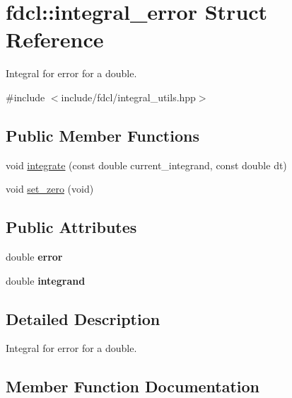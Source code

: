 \hypertarget{structfdcl_1_1integral__error}{}\section{fdcl\+:\+:integral\+\_\+error Struct Reference}
\label{structfdcl_1_1integral__error}


Integral for error for a double.  




{\ttfamily \#include $<$include/fdcl/integral\+\_\+utils.\+hpp$>$}

\subsection*{Public Member Functions}
\begin{DoxyCompactItemize}
\item 
void \hyperlink{structfdcl_1_1integral__error_a93deb8d83156931e7bbb4a0c85cc780a}{integrate} (const double current\+\_\+integrand, const double dt)
\item 
void \hyperlink{structfdcl_1_1integral__error_a476cbf36ded6ba86b13a0f80da526a7b}{set\+\_\+zero} (void)
\end{DoxyCompactItemize}
\subsection*{Public Attributes}
\begin{DoxyCompactItemize}
\item 
double {\bfseries error}\hypertarget{structfdcl_1_1integral__error_a6472ae97067e3da1b67401087ea37026}{}\label{structfdcl_1_1integral__error_a6472ae97067e3da1b67401087ea37026}

\item 
double {\bfseries integrand}\hypertarget{structfdcl_1_1integral__error_a25f586350f98d1ed930af80436916494}{}\label{structfdcl_1_1integral__error_a25f586350f98d1ed930af80436916494}

\end{DoxyCompactItemize}


\subsection{Detailed Description}
Integral for error for a double. 

\subsection{Member Function Documentation}
